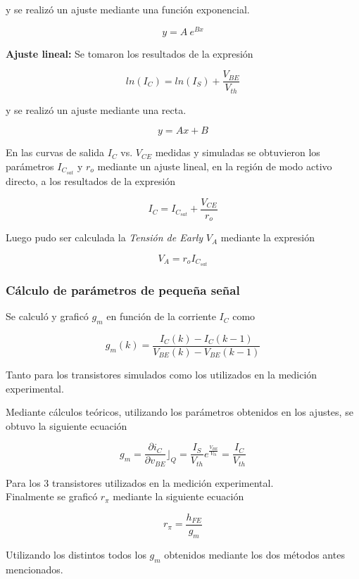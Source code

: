 \documentclass[10pt,spanish,a4paper,openany,notitlepage]{article}
\begin{document}
y se realizó un ajuste mediante una función exponencial.

\[ \displaystyle y  = A\ e^{B x} \]

\textbf{Ajuste lineal:} Se tomaron los resultados de la expresión

\[ \displaystyle ln(I_C)  = ln(I_S) + \frac{V_{BE}}{V_{th}} \]

y se realizó un ajuste mediante una recta.

\[ \displaystyle y  = A x + B \]

En las curvas de salida $I_C$ vs. $V_{CE}$ medidas y simuladas se obtuvieron los parámetros $I_{C_{sat}}$ y $r_o$ mediante un ajuste lineal, en la región de modo activo directo, a los resultados de la expresión

\[ \displaystyle I_C  = I_{C_{sat}} + \frac{V_{CE}}{r_o} \]

Luego pudo ser calculada la \emph{Tensión de Early} $V_A$ mediante la expresión

\[ \displaystyle V_A = r_o I_{C_{sat}} \]

\subsubsection{Cálculo de parámetros de pequeña señal}

Se calculó y graficó $g_m$ en función de la corriente $I_C$ como

\[ \displaystyle g_m(k) = \frac{I_C(k) - I_C(k-1)}{V_{BE}(k)-V_{BE}(k-1)} \]

Tanto para los transistores simulados como los utilizados en la medición experimental.

Mediante cálculos teóricos, utilizando los parámetros obtenidos en los ajustes, se obtuvo la siguiente ecuación

\[ \displaystyle  g_m = \frac{\displaystyle \partial i_{C}}{\displaystyle \partial v_{BE}}\Bigr\rfloor_Q = \frac{\displaystyle I_S}{\displaystyle V_{th}} e^{\frac{\displaystyle V_{BE}}{\displaystyle V_{th}}} = \frac{\displaystyle I_C}{\displaystyle V_{th}} \]

Para los 3 transistores utilizados en la medición experimental.\\

Finalmente se graficó $r_\pi$ mediante la siguiente ecuación

\[ \displaystyle r_\pi = \frac{h_{FE}}{g_m} \]

Utilizando los distintos todos los $g_m$ obtenidos mediante los dos métodos antes mencionados.
\end{document}
